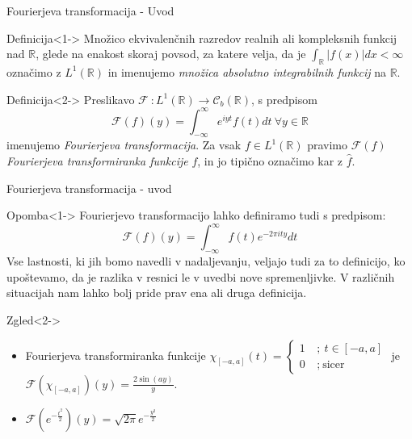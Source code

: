 \documentclass[t, 8pt]{beamer} %
\newcommand{\abs}[1]{\ensuremath{\lvert #1 \rvert}}
\newcommand{\mth}[1]{\ensuremath{\mathbb{#1}}}
\newcommand{\R}{\mth{R}}
\newcommand{\pojem}[1]{\emph{#1}}
\newcommand{\map}[3]{\ensuremath{{#1}~: {#2} \rightarrow {#3}}}
\newcommand{\fillblack}[1]{
	\begin{tikzpicture}[remember picture, overlay]
		\node [shift={(0 cm,0cm)}]  at (current page.south west)
		{%
			\begin{tikzpicture}[remember picture, overlay] at (current page.south west)
				\draw [fill=black] (0, 0) -- (0,#1 \paperheight) --
				(\paperwidth,#1 \paperheight) -- (\paperwidth,0) -- cycle ;
			\end{tikzpicture}
		};
		\draw (current page.north west) rectangle (current page.south east);
	\end{tikzpicture}
}
\begin{document}
		\begin{frame}{Fourierjeva transformacija - Uvod}
			
			\begin{block}{Definicija}<1->
				Množico ekvivalenčnih razredov realnih ali kompleksnih funkcij nad $\R$, glede na enakost skoraj povsod, za katere velja, da je $\int_{\R}\abs{f(x)} dx < \infty$ označimo z $L^1(\R)$ in imenujemo \pojem{množica absolutno integrabilnih funkcij} na $\R$.
			\end{block}
			\begin{block}{Definicija}<2->
					Preslikavo $\map{\mathcal{F}}{L^1(\R)}{\mathcal{C}_b(\R)}$, s predpisom $$\mathcal{F}(f)(y) = \int_{-\infty}^{\infty}e^{iyt}f(t)dt~\forall y\in\R$$ imenujemo \pojem{Fourierjeva transformacija}. Za vsak $f\in L^1(\R)$ pravimo $\mathcal{F}(f)$ \pojem{Fourierjeva transformiranka funkcije} $f$, in jo tipično označimo kar z $\hat{f}$.
			\end{block}
		\end{frame}
		
		\begin{frame}{Fourierjeva transformacija - uvod}
			\begin{block}{Opomba}<1->
				Fourierjevo transformacijo lahko definiramo tudi s predpisom: $$\mathcal{F}(f)(y) = \int_{-\infty}^{\infty}f(t)e^{-2\pi ity} dt$$ Vse lastnosti, ki jih bomo navedli v nadaljevanju, veljajo tudi za to definicijo, ko upoštevamo, da je razlika v resnici le v uvedbi nove spremenljivke. V različnih situacijah nam lahko bolj pride prav ena ali druga definicija.
			\end{block}
			\begin{block}{Zgled}<2->
				\begin{itemize}
					\item Fourierjeva transformiranka funkcije $\chi_{[-a, a]}(t) = \begin{cases}
						1~&;~ t\in [-a, a] \\
						0~&;~\text{sicer}
					\end{cases}$ je $\mathcal{F}(\chi_{[-a, a]})(y) = \frac{2\sin(ay)}{y}$.
					\item $\mathcal{F}(e^{-\frac{t^2}{2}})(y)=\sqrt{2\pi}e^{-\frac{y^2}{2}}$
				\end{itemize}
			\end{block}
		\end{frame}
		
\end{document}
